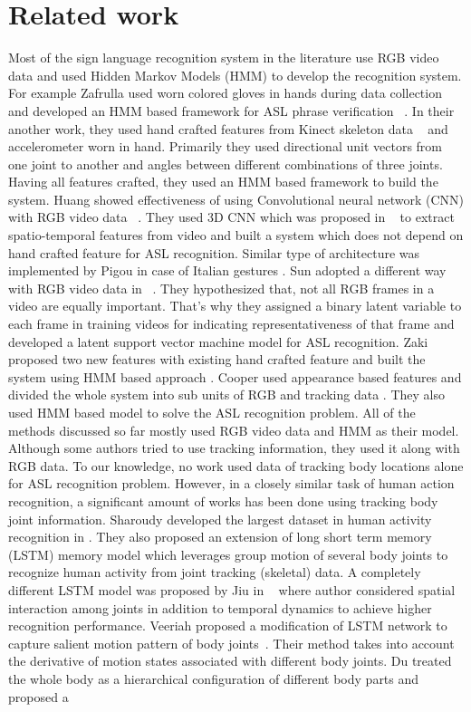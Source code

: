 \documentclass[10pt,twocolumn,letterpaper]{article}
\begin{document}
\section{Related work}
Most of the sign language recognition system in the literature use RGB video data and used Hidden Markov Models (HMM) to develop the recognition system. For example Zafrulla \etal used worn colored gloves in hands during data collection and developed an HMM based framework for ASL phrase verification ~\cite{copycat_zafrulla}. In their another work, they used hand crafted features from Kinect skeleton data ~\cite{Zafrulla:2011:ASL:2070481.2070532} and accelerometer worn in hand. Primarily they used directional unit vectors from one joint to another and angles between different combinations of three joints. Having all features crafted, they used an HMM based framework to build the system. Huang \etal showed effectiveness of using Convolutional neural network (CNN) with RGB video data ~\cite{7177428}. They used 3D CNN which was proposed in ~\cite{Ji:2013:CNN:2412386.2412939} to extract spatio-temporal features from video and built a system which does not depend on hand crafted feature for ASL recognition. Similar type of architecture was implemented by Pigou \etal in case of Italian gestures \cite{978-3-319-16178-5_40}. Sun \etal adopted a different way with RGB video data in ~\cite{Sun:2015:LSV:2753829.2629481}. They hypothesized that, not all RGB frames in a video are equally important. That's why they assigned a binary latent variable to each frame in training videos for indicating representativeness of that frame and developed a latent support vector machine model for ASL recognition. Zaki \etal proposed two new features with existing hand crafted feature and built the system using HMM based approach \cite{ZAKI2011572}. Cooper \etal used appearance based features and divided the whole system into sub units of RGB and tracking data \cite{Cooper2017}. They also used HMM based model to solve the ASL recognition problem. All of the methods discussed so far mostly used RGB video data and HMM as their model. Although some authors tried to use tracking information, they used it along with RGB data. To our knowledge, no work used data of tracking body locations alone for ASL recognition problem. However, in a closely similar task of human action recognition, a significant amount of works has been done using tracking body joint information. Sharoudy \etal developed the largest dataset in human activity recognition in \cite{7780484}. They also proposed an extension of long short term memory (LSTM) memory model which leverages group motion of several body joints to recognize human activity from joint tracking (skeletal) data. A completely different LSTM model was proposed by Jiu \etal in ~\cite{8101019} where author considered spatial interaction among joints in addition to temporal dynamics to achieve higher recognition performance. Veeriah \etal proposed a modification of LSTM network to capture salient motion pattern of body joints~\cite{7410817}. Their method takes into account the derivative of motion states associated with different body joints. Du \etal treated the whole body as a hierarchical configuration of different body parts and proposed a 
\end{document}
